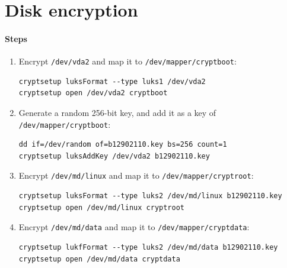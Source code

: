 \documentclass[12pt, a4paper]{article}
\begin{document}
  \section{Disk encryption}
  \paragraph{Steps}
  \begin{enumerate}
    \item Encrypt \verb|/dev/vda2| and map it to \verb|/dev/mapper/cryptboot|:
    \begin{verbatim}
cryptsetup luksFormat --type luks1 /dev/vda2
cryptsetup open /dev/vda2 cryptboot\end{verbatim}
    \item Generate a random 256-bit key, and add it as a key of
    \verb|/dev/mapper/cryptboot|:
    \begin{verbatim}
dd if=/dev/random of=b12902110.key bs=256 count=1
cryptsetup luksAddKey /dev/vda2 b12902110.key\end{verbatim}
    \item Encrypt \verb|/dev/md/linux| and map it to \verb|/dev/mapper/cryptroot|:
    \begin{verbatim}
cryptsetup luksFormat --type luks2 /dev/md/linux b12902110.key
cryptsetup open /dev/md/linux cryptroot\end{verbatim}
    \item Encrypt \verb|/dev/md/data| and map it to \verb|/dev/mapper/cryptdata|:
     \begin{verbatim}
cryptsetup lukfFormat --type luks2 /dev/md/data b12902110.key
cryptsetup open /dev/md/data cryptdata\end{verbatim}
  \end{enumerate}
\end{document}
